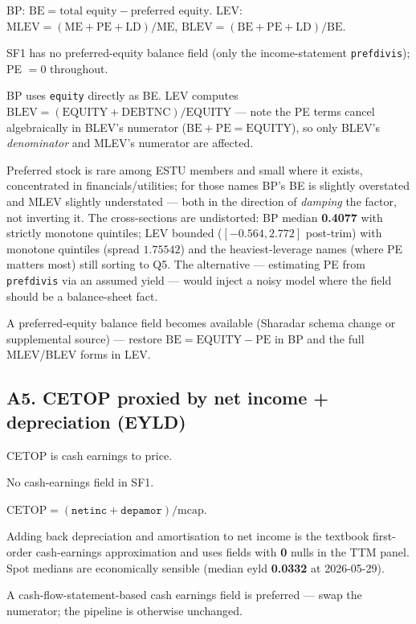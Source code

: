 \documentclass[11pt,a4paper]{article}
\begin{document}
\begin{description}[style=nextline]
  \item[USE4] BP: $\mathrm{BE} = \text{total equity} - \text{preferred equity}$.
    LEV: $\mathrm{MLEV} = (\mathrm{ME}+\mathrm{PE}+\mathrm{LD})/\mathrm{ME}$,
    $\mathrm{BLEV} = (\mathrm{BE}+\mathrm{PE}+\mathrm{LD})/\mathrm{BE}$.
  \item[Deviation] SF1 has no preferred-equity balance field (only the
    income-statement \texttt{prefdivis}); PE $=0$ throughout.
  \item[Solution] BP uses \texttt{equity} directly as BE. LEV computes
    $\mathrm{BLEV} = (\mathrm{EQUITY}+\mathrm{DEBTNC})/\mathrm{EQUITY}$ --- note
    the PE terms cancel algebraically in BLEV's numerator
    ($\mathrm{BE}+\mathrm{PE} = \mathrm{EQUITY}$), so only BLEV's
    \emph{denominator} and MLEV's numerator are affected.
  \item[Validity] Preferred stock is rare among ESTU members and small where it
    exists, concentrated in financials/utilities; for those names BP's BE is
    slightly overstated and MLEV slightly understated --- both in the direction
    of \emph{damping} the factor, not inverting it. The cross-sections are
    undistorted: BP median \textbf{0.4077} with strictly monotone quintiles;
    LEV bounded ($[-0.564, 2.772]$ post-trim) with monotone quintiles (spread
    $1.75542$) and the heaviest-leverage names (where PE matters most) still
    sorting to Q5. The alternative --- estimating PE from \texttt{prefdivis}
    via an assumed yield --- would inject a noisy model where the field should
    be a balance-sheet fact.
  \item[Revisit when] A preferred-equity balance field becomes available
    (Sharadar schema change or supplemental source) --- restore
    $\mathrm{BE} = \mathrm{EQUITY} - \mathrm{PE}$ in BP and the full MLEV/BLEV
    forms in LEV.
\end{description}

\subsection{A5. CETOP proxied by net income + depreciation (EYLD)}

\begin{description}[style=nextline]
  \item[USE4] CETOP is cash earnings to price.
  \item[Deviation] No cash-earnings field in SF1.
  \item[Solution] $\mathrm{CETOP} = (\texttt{netinc} + \texttt{depamor})/\text{mcap}$.
  \item[Validity] Adding back depreciation and amortisation to net income is the
    textbook first-order cash-earnings approximation and uses fields with
    \textbf{0} nulls in the TTM panel. Spot medians are economically sensible
    (median eyld \textbf{0.0332} at 2026-05-29).
  \item[Revisit when] A cash-flow-statement-based cash earnings field is
    preferred --- swap the numerator; the pipeline is otherwise unchanged.
\end{description}
\end{document}
